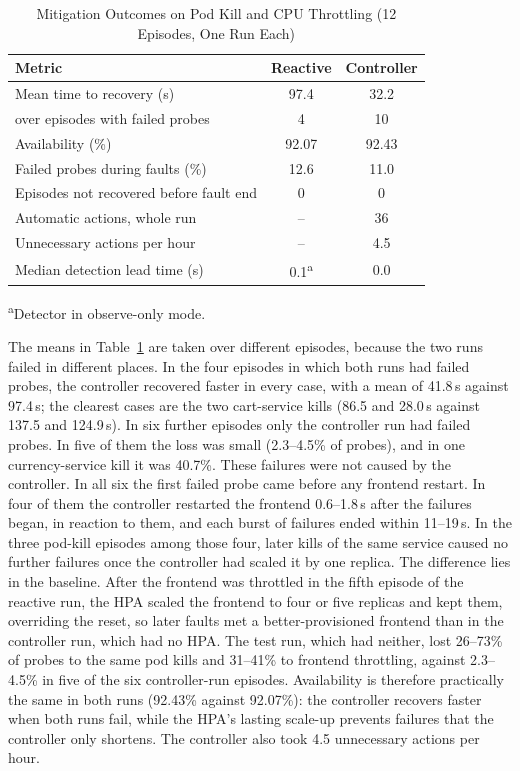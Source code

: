 \documentclass[journal]{IEEEtran}
\begin{document}
\begin{table}[!t]
\centering
\caption{Mitigation Outcomes on Pod Kill and CPU Throttling (12 Episodes, One Run Each)}
\label{tab:loop}
\begin{tabular}{@{}lcc@{}}
\toprule
Metric & Reactive & Controller \\
\midrule
Mean time to recovery (s) & 97.4 & 32.2 \\
\quad over episodes with failed probes & 4 & 10 \\
Availability (\%) & 92.07 & 92.43 \\
Failed probes during faults (\%) & 12.6 & 11.0 \\
Episodes not recovered before fault end & 0 & 0 \\
Automatic actions, whole run & -- & 36 \\
Unnecessary actions per hour & -- & 4.5 \\
Median detection lead time (s) & 0.1\textsuperscript{a} & 0.0 \\
\bottomrule
\end{tabular}

\smallskip
\footnotesize\textsuperscript{a}Detector in observe-only mode.
\end{table}

The means in Table~\ref{tab:loop} are taken over different episodes, because the two runs failed in different places. In the four episodes in which both runs had failed probes, the controller recovered faster in every case, with a mean of 41.8\,s against 97.4\,s; the clearest cases are the two cart-service kills (86.5 and 28.0\,s against 137.5 and 124.9\,s). In six further episodes only the controller run had failed probes. In five of them the loss was small (2.3--4.5\% of probes), and in one currency-service kill it was 40.7\%. These failures were not caused by the controller. In all six the first failed probe came before any frontend restart. In four of them the controller restarted the frontend 0.6--1.8\,s after the failures began, in reaction to them, and each burst of failures ended within 11--19\,s. In the three pod-kill episodes among those four, later kills of the same service caused no further failures once the controller had scaled it by one replica. The difference lies in the baseline. After the frontend was throttled in the fifth episode of the reactive run, the HPA scaled the frontend to four or five replicas and kept them, overriding the reset, so later faults met a better-provisioned frontend than in the controller run, which had no HPA. The test run, which had neither, lost 26--73\% of probes to the same pod kills and 31--41\% to frontend throttling, against 2.3--4.5\% in five of the six controller-run episodes. Availability is therefore practically the same in both runs (92.43\% against 92.07\%): the controller recovers faster when both runs fail, while the HPA's lasting scale-up prevents failures that the controller only shortens. The controller also took 4.5 unnecessary actions per hour.
\end{document}
